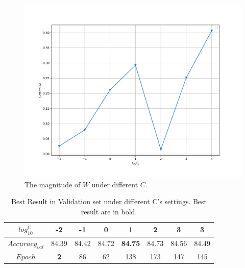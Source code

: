 \documentclass[journal, a4paper]{IEEEtran}
\begin{document}
\begin{figure}[!hbt]
	\begin{center}
		\includegraphics[width=\columnwidth]{c_magnitude}
		\caption{The magnitude of $W$ under different $C$.}
		\label{fig:c_mag}
	\end{center}
\end{figure} \par

\begin{table}[!hbt]
	\begin{center}
		\caption{Best Result in Validation set under different C's settings. Best result are in bold.}
		\label{tab:C_performance}
		\begin{tabular}{|c|c|c|c|c|c|c|c|}
			\hline
			$log_{10}^{C}$ & -2 & -1 & 0 & 1 & 2 & 3 & 3 \\
			\hline
			$Accuracy_{val}$   & 84.39 & 84.42 & 84.72 & \textbf{84.75} & 84.73 & 84.56 & 84.49   \\
			\hline
			$Epoch$  & \textbf{2} & 86 & 62 & 138 & 173 & 147 & 145   \\
			\hline
		\end{tabular}
	\end{center}
\end{table} \par
\end{document}

